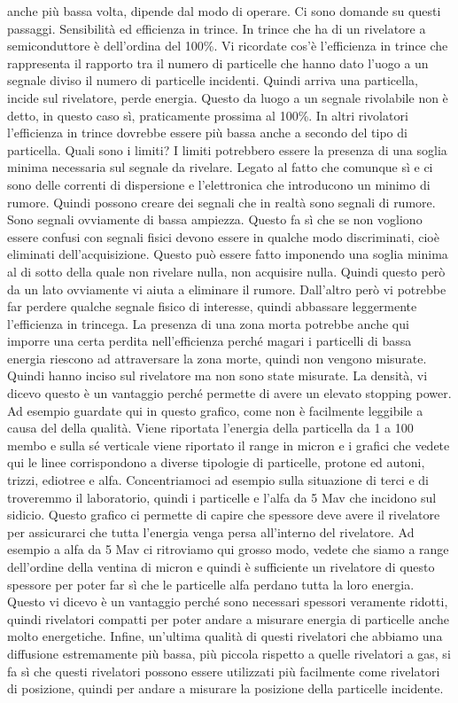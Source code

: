{anche più bassa volta, dipende dal modo di operare. Ci sono domande su questi passaggi. Sensibilità ed efficienza in trince. In trince che ha di un rivelatore a semiconduttore è dell'ordina del 100\%. Vi ricordate cos'è l'efficienza in trince che rappresenta il rapporto tra il numero di particelle che hanno dato l'uogo a un segnale diviso il numero di particelle incidenti. Quindi arriva una particella, incide sul rivelatore, perde energia. Questo da luogo a un segnale rivolabile non è detto, in questo caso sì, praticamente prossima al 100\%. In altri rivolatori l'efficienza in trince dovrebbe essere più bassa anche a secondo del tipo di particella. Quali sono i limiti? I limiti potrebbero essere la presenza di una soglia minima necessaria sul segnale da rivelare. Legato al fatto che comunque sì e ci sono delle correnti di dispersione e l'elettronica che introducono un minimo di rumore. Quindi possono creare dei segnali che in realtà sono segnali di rumore. Sono segnali ovviamente di bassa ampiezza. Questo fa sì che se non vogliono essere confusi con segnali fisici devono essere in qualche modo discriminati, cioè eliminati dell'acquisizione. Questo può essere fatto imponendo una soglia minima al di sotto della quale non rivelare nulla, non acquisire nulla. Quindi questo però da un lato ovviamente vi aiuta a eliminare il rumore. Dall'altro però vi potrebbe far perdere qualche segnale fisico di interesse, quindi abbassare leggermente l'efficienza in trincega. La presenza di una zona morta potrebbe anche qui imporre una certa perdita nell'efficienza perché magari i particelli di bassa energia riescono ad attraversare la zona morte, quindi non vengono misurate. Quindi hanno inciso sul rivelatore ma non sono state misurate. La densità, vi dicevo questo è un vantaggio perché permette di avere un elevato stopping power. Ad esempio guardate qui in questo grafico, come non è facilmente leggibile a causa del della qualità. Viene riportata l'energia della particella da 1 a 100 membo e sulla sé verticale viene riportato il range in micron e i grafici che vedete qui le linee corrispondono a diverse tipologie di particelle, protone ed autoni, trizzi, ediotree e alfa. Concentriamoci ad esempio sulla situazione di terci e di troveremmo il laboratorio, quindi i particelle e l'alfa da 5 Mav che incidono sul sidicio. Questo grafico ci permette di capire che spessore deve avere il rivelatore per assicurarci che tutta l'energia venga persa all'interno del rivelatore. Ad esempio a alfa da 5 Mav ci ritroviamo qui grosso modo, vedete che siamo a range dell'ordine della ventina di micron e quindi è sufficiente un rivelatore di questo spessore per poter far sì che le particelle alfa perdano tutta la loro energia. Questo vi dicevo è un vantaggio perché sono necessari spessori veramente ridotti, quindi rivelatori compatti per poter andare a misurare energia di particelle anche molto energetiche. Infine, un'ultima qualità di questi rivelatori che abbiamo una diffusione estremamente più bassa, più piccola rispetto a quelle rivelatori a gas, si fa sì che questi rivelatori possono essere utilizzati più facilmente come rivelatori di posizione, quindi per andare a misurare la posizione della particelle incidente.

}
